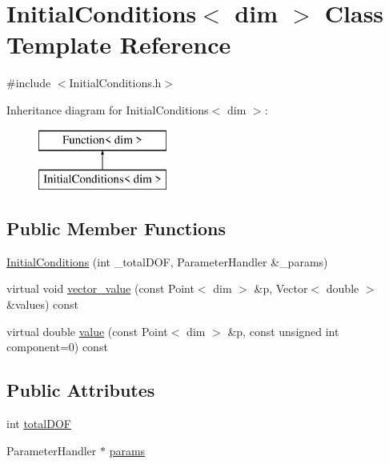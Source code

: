 \section{Initial\-Conditions$<$ dim $>$ Class Template Reference}
\label{class_initial_conditions}


{\ttfamily \#include $<$Initial\-Conditions.\-h$>$}

Inheritance diagram for Initial\-Conditions$<$ dim $>$\-:\begin{figure}[H]
\begin{center}
\leavevmode
\includegraphics[height=2.000000cm]{class_initial_conditions}
\end{center}
\end{figure}
\subsection*{Public Member Functions}
\begin{DoxyCompactItemize}
\item 
\hyperlink{class_initial_conditions_a86f1233a3d8103059d1a499e1e1d9c04}{Initial\-Conditions} (int \-\_\-total\-D\-O\-F, Parameter\-Handler \&\-\_\-params)
\item 
virtual void \hyperlink{class_initial_conditions_ae2e9e28f0704e62fa54fc7e26dfcd065}{vector\-\_\-value} (const Point$<$ dim $>$ \&p, Vector$<$ double $>$ \&values) const 
\item 
virtual double \hyperlink{class_initial_conditions_af07c55aae0a37d719b86b6471bd9422f}{value} (const Point$<$ dim $>$ \&p, const unsigned int component=0) const 
\end{DoxyCompactItemize}
\subsection*{Public Attributes}
\begin{DoxyCompactItemize}
\item 
int \hyperlink{class_initial_conditions_acf5f14c806d215a0bf5c9f46d3e23607}{total\-D\-O\-F}
\item 
Parameter\-Handler $\ast$ \hyperlink{class_initial_conditions_a31d5e7a5228d9d55ba00fae854fcfaa0}{params}
\end{DoxyCompactItemize}


